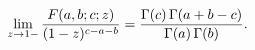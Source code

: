 \[\lim_{z\to 1-}\frac{\mathop{F\/}\nolimits\!\left(a,b;c;z\right)}{(1-z)^{c-a-b}%
}=\frac{\mathop{\Gamma\/}\nolimits\!\left(c\right)\mathop{\Gamma\/}\nolimits\!%
\left(a+b-c\right)}{\mathop{\Gamma\/}\nolimits\!\left(a\right)\mathop{\Gamma\/%
}\nolimits\!\left(b\right)}.\]